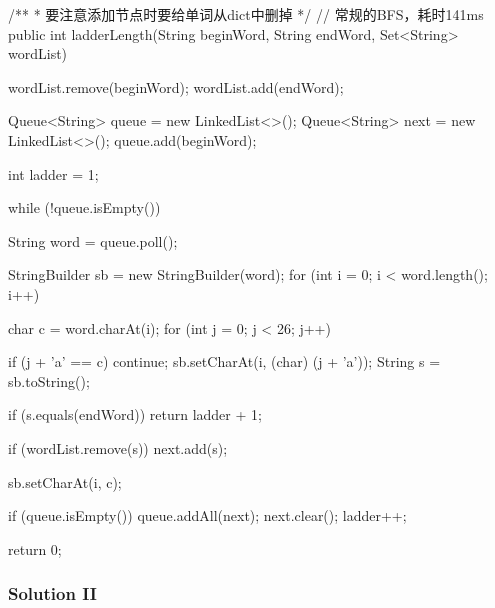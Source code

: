 \begin{Code}
/**
 * 要注意添加节点时要给单词从dict中删掉
 */
// 常规的BFS，耗时141ms
public int ladderLength(String beginWord, String endWord, Set<String> wordList) {
    wordList.remove(beginWord);
    wordList.add(endWord);

    Queue<String> queue = new LinkedList<>();
    Queue<String> next = new LinkedList<>();
    queue.add(beginWord);

    int ladder = 1;

    while (!queue.isEmpty()) {
        String word = queue.poll();

        StringBuilder sb = new StringBuilder(word);
        for (int i = 0; i < word.length(); i++) {
            char c = word.charAt(i);
            for (int j = 0; j < 26; j++) {
                if (j + 'a' == c) {
                    continue;
                }
                sb.setCharAt(i, (char) (j + 'a'));
                String s = sb.toString();

                if (s.equals(endWord)) {
                    return ladder + 1;
                }

                if (wordList.remove(s)) {
                    next.add(s);
                }
            }
            sb.setCharAt(i, c);
        }

        if (queue.isEmpty()) {
            queue.addAll(next);
            next.clear();
            ladder++;
        }
    }

    return 0;
}
\end{Code}

\newpage

\subsubsection{Solution II}

